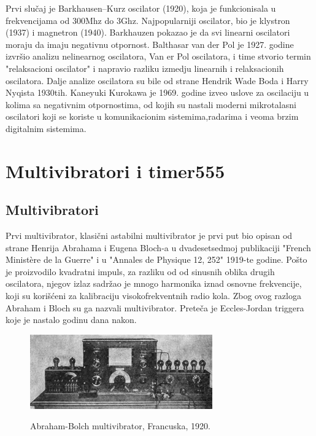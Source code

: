 \documentclass[12pt,a4paper]{article}
\begin{document}
Prvi slučaj je Barkhausen–Kurz oscilator (1920), koja je funkcionisala u frekvencijama od 300Mhz do 3Ghz. 
Najpopularniji oscilator, bio je klystron (1937) i magnetron (1940). \cite{wikiOsc}
Barkhauzen pokazao je da svi linearni oscilatori moraju da imaju negativnu otpornost.
Balthasar van der Pol je 1927. godine izvršio analizu nelinearnog oscilatora, Van er Pol oscilatora, i time stvorio termin "relaksacioni oscilator" i napravio razliku izmedju linearnih i relaksacionih oscilatora.\newline
Dalje analize oscilatora su bile od strane Hendrik Wade Boda i Harry Nyqista 1930tih. 
Kaneyuki Kurokawa je 1969. godine izveo uslove za oscilaciju u kolima sa negativnim otpornostima, od kojih su nastali moderni mikrotalasni oscilatori\cite{wikiOsc} koji se koriste u komunikacionim sistemima,radarima i veoma brzim digitalnim sistemima.
\newpage
\noindent\makebox[\linewidth]{\rule{0.8\paperwidth}{.4pt}}
\section{Multivibratori i timer555}
\subsection{Multivibratori}
Prvi multivibrator, klasični astabilni multivibrator je prvi put bio opisan od strane Henrija Abrahama i Eugena Bloch-a u dvadesetsedmoj publikaciji "French Ministère de la Guerre" i u "Annales de Physique 12, 252" 1919-te godine. 
Pošto je proizvodilo kvadratni impuls, za razliku od od sinusnih oblika drugih oscilatora, njegov izlaz sadržao je mnogo harmonika iznad osnovne frekvencije,  koji su korišćeni za kalibraciju visokofrekventnih radio kola. Zbog ovog razloga Abraham i Bloch su ga nazvali multivibrator. Preteča je Eccles-Jordan triggera koje je nastalo godinu dana nakon.\cite{multivibrator}
\begin{figure}[ht]
  \centering
  \includegraphics[width=0.7\textwidth]{vakum}
  \caption{Abraham-Bolch multivibrator, Francuska, 1920.}\cite{multivibrator}
\end{figure}
\end{document}
